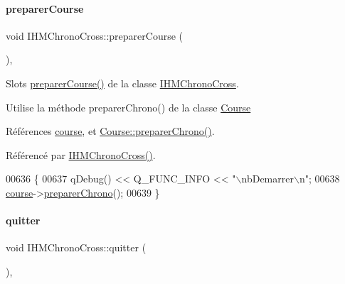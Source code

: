 \paragraph{\texorpdfstring{preparer\+Course}{preparerCourse}}
{\footnotesize\ttfamily void I\+H\+M\+Chrono\+Cross\+::preparer\+Course (\begin{DoxyParamCaption}{ }\end{DoxyParamCaption})\hspace{0.3cm}{\ttfamily [private]}, {\ttfamily [slot]}}



Slots \hyperlink{class_i_h_m_chrono_cross_a4926e7524f4fd76ccceb0aef5ebcb203}{preparer\+Course()} de la classe \hyperlink{class_i_h_m_chrono_cross}{I\+H\+M\+Chrono\+Cross}. 

Utilise la méthode preparer\+Chrono() de la classe \hyperlink{class_course}{Course} 

Références \hyperlink{class_i_h_m_chrono_cross_a03a8226c0e7f423d29302d9a06284ab4}{course}, et \hyperlink{class_course_a50596f54553b48fa29170a6b42b6e9d4}{Course\+::preparer\+Chrono()}.



Référencé par \hyperlink{class_i_h_m_chrono_cross_a479fc90733fba3e65fb06aa4a3adc02e}{I\+H\+M\+Chrono\+Cross()}.


\begin{DoxyCode}
00636 \{
00637     qDebug() << Q\_FUNC\_INFO << \textcolor{stringliteral}{"\(\backslash\)nbDemarrer\(\backslash\)n"};
00638     \hyperlink{class_i_h_m_chrono_cross_a03a8226c0e7f423d29302d9a06284ab4}{course}->\hyperlink{class_course_a50596f54553b48fa29170a6b42b6e9d4}{preparerChrono}();
00639 \}
\end{DoxyCode}
\mbox{\label{class_i_h_m_chrono_cross_a283c721d31f90031d9a189eafb303b84}} 
\paragraph{\texorpdfstring{quitter}{quitter}}
{\footnotesize\ttfamily void I\+H\+M\+Chrono\+Cross\+::quitter (\begin{DoxyParamCaption}{ }\end{DoxyParamCaption})\hspace{0.3cm}{\ttfamily [private]}, {\ttfamily [slot]}}



